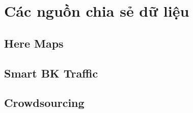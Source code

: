 
\chapter{Các nguồn chia sẻ dữ liệu} %

\label{Chapter3}

\section{Here Maps}
\section{Smart BK Traffic}
\section{Crowdsourcing}
